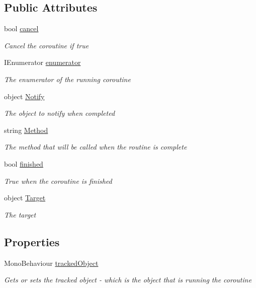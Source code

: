 \subsection*{Public Attributes}
\begin{DoxyCompactItemize}
\item 
bool \hyperlink{class_radical_routine_a6df3c3e067bcfb939c9d1b6c0e08cc9c}{cancel}
\begin{DoxyCompactList}\small\item\em Cancel the coroutine if true \end{DoxyCompactList}\item 
I\+Enumerator \hyperlink{class_radical_routine_a001dcc418773639592a9a4e1671c4e9d}{enumerator}
\begin{DoxyCompactList}\small\item\em The enumerator of the running coroutine \end{DoxyCompactList}\item 
object \hyperlink{class_radical_routine_ae35334ed495c3b720bf7f797777f12af}{Notify}
\begin{DoxyCompactList}\small\item\em The object to notify when completed \end{DoxyCompactList}\item 
string \hyperlink{class_radical_routine_a2bb230163b0827ab0c643cff9cc8523b}{Method}
\begin{DoxyCompactList}\small\item\em The method that will be called when the routine is complete \end{DoxyCompactList}\item 
bool \hyperlink{class_radical_routine_a703633102ff8fd31f582c0e18def8680}{finished}
\begin{DoxyCompactList}\small\item\em True when the coroutine is finished \end{DoxyCompactList}\item 
object \hyperlink{class_radical_routine_a6ee5e181a83dadd6d9a52a398f4b84f2}{Target}
\begin{DoxyCompactList}\small\item\em The target \end{DoxyCompactList}\end{DoxyCompactItemize}
\subsection*{Properties}
\begin{DoxyCompactItemize}
\item 
Mono\+Behaviour \hyperlink{class_radical_routine_a235e7bd6879257332c2836c021bae75e}{tracked\+Object}
\begin{DoxyCompactList}\small\item\em Gets or sets the tracked object -\/ which is the object that is running the coroutine \end{DoxyCompactList}\end{DoxyCompactItemize}
